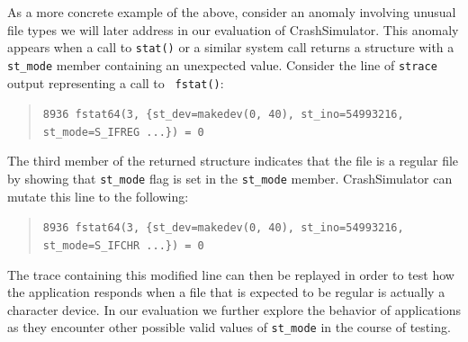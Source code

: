 
    As a more concrete example of the above, consider an anomaly
    involving unusual file types we will later address in our evaluation of
    CrashSimulator.  This anomaly appears when a call to {\tt stat()} or a similar system
    call returns a structure with a {\tt st\_mode} member containing an unexpected
    value. Consider the line of {\tt strace} output representing a call to {\tt
      fstat()}:
    \begin{quote}
      {\tt 8936  fstat64(3, \{st\_dev=makedev(0, 40), st\_ino=54993216, st\_mode=S\_IFREG ...\}) = 0}
    \end{quote}
    The third member of the returned structure indicates that the file is a
    regular file by showing that {\tt st\_mode} flag is set in the {\tt st\_mode}
    member.  CrashSimulator can mutate this  line to the following:

    \begin{quote}
      {\tt 8936  fstat64(3, \{st\_dev=makedev(0, 40), st\_ino=54993216, st\_mode=S\_IFCHR ...\}) = 0}
    \end{quote}
    
    The trace containing this modified line can then be replayed in order to
    test how
    the application responds when a file
    that is expected to be regular is actually a character device. In our
    evaluation we further explore the behavior of applications as they encounter
    other possible valid values of {\tt st\_mode} in the course of testing.


